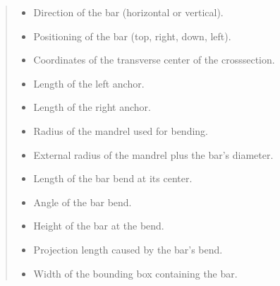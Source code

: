 \documentclass[a4paper,10pt,english]{sphinxmanual}
\begin{document}
\begin{fulllineitems}
\begin{quote}
\begin{description}
\begin{itemize}
\item {} 
\sphinxAtStartPar
{} \textendash{} Direction of the bar (horizontal or vertical).

\item {} 
\sphinxAtStartPar
{} \textendash{} Positioning of the bar (top, right, down, left).

\item {} 
\sphinxAtStartPar
{} \textendash{} Coordinates of the transverse center of the cross\sphinxhyphen{}section.

\item {} 
\sphinxAtStartPar
{} \textendash{} Length of the left anchor.

\item {} 
\sphinxAtStartPar
{} \textendash{} Length of the right anchor.

\item {} 
\sphinxAtStartPar
{} \textendash{} Radius of the mandrel used for bending.

\item {} 
\sphinxAtStartPar
{} \textendash{} External radius of the mandrel plus the bar’s diameter.

\item {} 
\sphinxAtStartPar
{} \textendash{} Length of the bar bend at its center.

\item {} 
\sphinxAtStartPar
{} \textendash{} Angle of the bar bend.

\item {} 
\sphinxAtStartPar
{} \textendash{} Height of the bar at the bend.

\item {} 
\sphinxAtStartPar
{} \textendash{} Projection length caused by the bar’s bend.

\item {} 
\sphinxAtStartPar
{} \textendash{} Width of the bounding box containing the bar.


\end{itemize}
\end{description}
\end{quote}
\end{fulllineitems}
\end{document}
